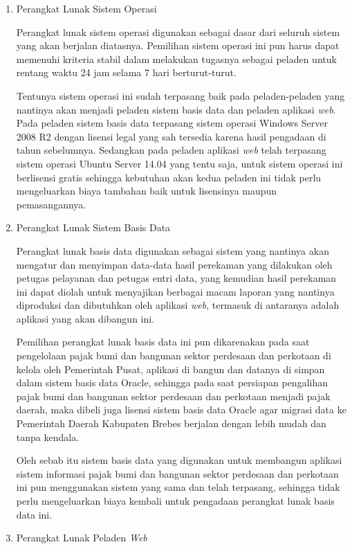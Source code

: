 \documentclass[pdftex,12pt, oneside]{article}
\begin{document}
\begin{enumerate}
	\item Perangkat Lunak Sistem Operasi
	
Perangkat lunak sistem operasi digunakan sebagai dasar dari seluruh sistem yang akan berjalan diatasnya. Pemilihan sistem operasi ini pun harus dapat memenuhi kriteria stabil dalam melakukan tugasnya sebagai peladen untuk rentang waktu 24 jam selama 7 hari berturut-turut.

Tentunya sistem operasi ini sudah terpasang baik pada peladen-peladen yang nantinya akan menjadi peladen sistem basis data dan peladen aplikasi \textit{web}. Pada peladen sistem basis data terpasang sistem operasi Windows Server 2008 R2 dengan lisensi legal yang sah tersedia karena hasil pengadaan di tahun sebelumnya. Sedangkan pada peladen aplikasi \textit{web} telah terpasang sistem operasi Ubuntu Server 14.04 yang tentu saja, untuk sistem operasi ini berlisensi gratis sehingga kebutuhan akan kedua peladen ini tidak perlu mengeluarkan biaya tambahan baik untuk lisensinya maupun pemasangannya.
	
	\item Perangkat Lunak Sistem Basis Data
	
Perangkat lunak basis data digunakan sebagai sistem yang nantinya akan mengatur dan menyimpan data-data hasil perekaman yang dilakukan oleh petugas pelayanan dan petugas entri data, yang kemudian hasil perekaman ini dapat diolah untuk menyajikan berbagai macam laporan yang nantinya diproduksi dan dibutuhkan oleh aplikasi \textit{web}, termasuk di antaranya adalah aplikasi yang akan dibangun ini.

Pemilihan perangkat lunak basis data ini pun dikarenakan pada saat pengelolaan pajak bumi dan bangunan sektor perdesaan dan perkotaan di kelola oleh Pemerintah Pusat, aplikasi di bangun dan datanya di simpan dalam sistem basis data Oracle, sehingga pada saat persiapan pengalihan pajak bumi dan bangunan sektor perdesaan dan perkotaan menjadi pajak daerah, maka dibeli juga lisensi sistem basis data Oracle agar migrasi data ke Pemerintah Daerah Kabupaten Brebes berjalan dengan lebih mudah dan tanpa kendala. 

Oleh sebab itu sistem basis data yang digunakan untuk membangun aplikasi sistem informasi pajak bumi dan bangunan sektor perdesaan dan perkotaan ini pun menggunakan sistem yang sama dan telah terpasang, sehingga tidak perlu mengeluarkan biaya kembali untuk pengadaan perangkat lunak basis data ini.
	
	\item Perangkat Lunak Peladen \textit{Web}
	

\end{enumerate}
\end{document}
